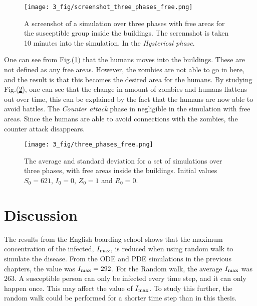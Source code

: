 \documentclass[%
twoside,                 %
final,                   %
chapterprefix=true,      %
open=right               %
10pt]{book}
\begin{document}
\vspace{3mm}




\vspace{3mm}




\begin{figure}[ht]
  \centerline{\texttt{[image: 3\_fig/screenshot\_three\_phases\_free.png]}}
  \caption{
  \label{fig:screenshot_three_phases_free} A screenshot of a simulation over three phases with free areas for the susceptible group inside the buildings. The scrennshot is taken 10 minutes into the simulation. In the \emph{Hysterical phase}.
  }
\end{figure}


One can see from Fig.(\ref{fig:screenshot_three_phases_free}) that the humans moves into the buildings. These are not defined as any free areas. However, the zombies are not able to go in here, and the result is that this becomes the desired area for the humans. By studying Fig.(\ref{fig:three_phases_free}), one can see that the change in amount of zombies and humans flattens out over time, this can be explained by the fact that the humans are now able to avoid battles. The \emph{Counter attack} phase in negligible in the simulation with free areas. Since the humans are able to avoid connections with the zombies, the counter attack disappears.  


\begin{figure}[ht]
  \centerline{\texttt{[image: 3\_fig/three\_phases\_free.png]}}
  \caption{
  \label{fig:three_phases_free} The average and standard deviation for a set of simulations over three phases, with free areas inside the buildings. Initial values $S_0 = 621$, $I_0 = 0$, $Z_0=1$ and $R_0=0$.
  }
\end{figure}






\section{Discussion}
The results from the English boarding school shows that the maximum concentration of the infected, $I_{\textrm{max}}$, is reduced when using random walk to simulate the disease. From the ODE and PDE simulations in the previous chapters, the value was $I_{\textrm{max}}=292$. For the Random walk, the average $I_{\textrm{max}}$ was 263. A susceptible person can only be infected every time step, and it can only happen once. This may affect the value of $I_{\textrm{max}}$. To study this further, the random walk could be performed for a shorter time step than in this thesis. 
\end{document}
